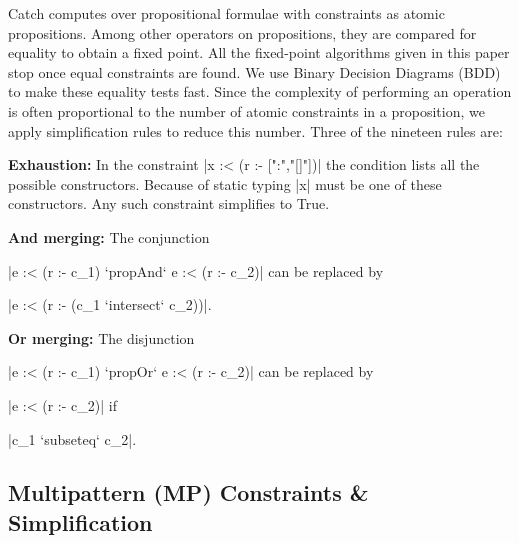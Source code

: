 \documentclass[preprint]{sigplanconf}
\newcommand{\para}[1]{\vspace{2mm}\noindent\textbf{#1}}
\begin{document}
Catch computes over propositional formulae with constraints as atomic propositions. Among other operators on propositions, they are compared for equality to obtain a fixed point. All the fixed-point algorithms given in this paper stop once equal constraints are found. We use Binary Decision Diagrams (BDD) \cite{lee:bdd} to make these equality tests fast. Since the complexity of performing an operation is often proportional to the number of atomic constraints in a proposition, we apply simplification rules to reduce this number. Three of the nineteen rules are:

\para{Exhaustion:} In the constraint |x :< (r :- [":","[]"])| the condition lists all the possible constructors. Because of static typing |x| must be one of these constructors. Any such constraint simplifies to True.

\para{And merging:} The conjunction \ignore|e :< (r :- c_1) `propAnd` e :< (r :- c_2)| can be replaced by \ignore|e :< (r :- (c_1 `intersect` c_2))|.

\para{Or merging:} The disjunction \ignore|e :< (r :- c_1) `propOr` e :< (r :- c_2)| can be replaced by \ignore|e :< (r :- c_2)| if \ignore|c_1 `subseteq` c_2|.


\subsection{Multipattern (MP) Constraints \& Simplification}
\label{sec:multipattern}
\end{document}
